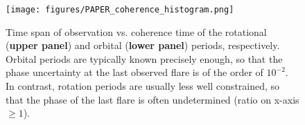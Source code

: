 \documentclass[twocolumn]{aastex631}
\begin{document}




\begin{figure}[ht!]
    \begin{centering}
        \texttt{[image: figures/PAPER\_coherence\_histogram.png]}
        \caption{
           Time span of observation vs. coherence time of the rotational (\textbf{upper panel}) and orbital (\textbf{lower panel}) periods, respectively. Orbital periods are typically known precisely enough, so that the phase uncertainty at the last observed flare is of the order of $10^{-2}$. In contrast, rotation periods are usually less well constrained, so that the phase of the last flare is often undetermined (ratio on x-axis $\geq 1$).
        }
        \label{fig:coherence_hist}
    \end{centering}
\end{figure}
\end{document}
